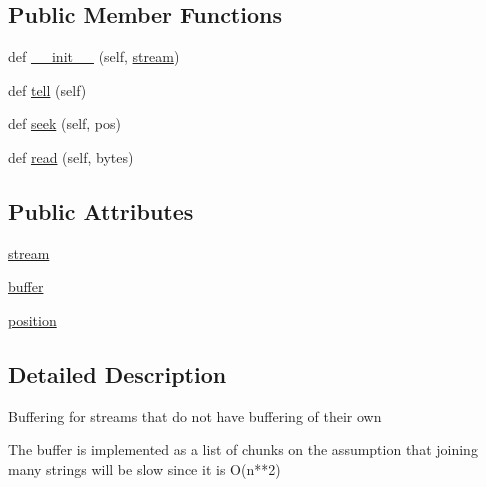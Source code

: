 \subsection*{Public Member Functions}
\begin{DoxyCompactItemize}
\item 
def \hyperlink{classpip_1_1__vendor_1_1html5lib_1_1__inputstream_1_1BufferedStream_a417a852fec5053ae58682a75467b247e}{\+\_\+\+\_\+init\+\_\+\+\_\+} (self, \hyperlink{classpip_1_1__vendor_1_1html5lib_1_1__inputstream_1_1BufferedStream_a8d9043490b8c7beb5ca1c5de691c8477}{stream})
\item 
def \hyperlink{classpip_1_1__vendor_1_1html5lib_1_1__inputstream_1_1BufferedStream_a22a41ab07663f278898e06b9329617b8}{tell} (self)
\item 
def \hyperlink{classpip_1_1__vendor_1_1html5lib_1_1__inputstream_1_1BufferedStream_a8e6f83658779f549f954f87d4c8a106b}{seek} (self, pos)
\item 
def \hyperlink{classpip_1_1__vendor_1_1html5lib_1_1__inputstream_1_1BufferedStream_a2620a3c5a57e5c2b680bd92705c6ae57}{read} (self, bytes)
\end{DoxyCompactItemize}
\subsection*{Public Attributes}
\begin{DoxyCompactItemize}
\item 
\hyperlink{classpip_1_1__vendor_1_1html5lib_1_1__inputstream_1_1BufferedStream_a8d9043490b8c7beb5ca1c5de691c8477}{stream}
\item 
\hyperlink{classpip_1_1__vendor_1_1html5lib_1_1__inputstream_1_1BufferedStream_a78ca46d1c976f5437481ca495a964b95}{buffer}
\item 
\hyperlink{classpip_1_1__vendor_1_1html5lib_1_1__inputstream_1_1BufferedStream_a4463b2cbe11847a7db385b16d12e71fe}{position}
\end{DoxyCompactItemize}


\subsection{Detailed Description}
\begin{DoxyVerb}Buffering for streams that do not have buffering of their own

The buffer is implemented as a list of chunks on the assumption that
joining many strings will be slow since it is O(n**2)
\end{DoxyVerb}
 

